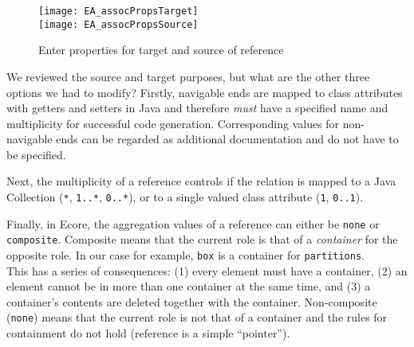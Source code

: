 \begin{itemize}
\vspace{0.5cm}

\begin{figure}[htbp]
	\centering
	  \texttt{[image: EA\_assocPropsTarget]}\\
  \vspace{1cm}
    \texttt{[image: EA\_assocPropsSource]}
	\caption{Enter properties for target and source of reference}
	\label{fig:reference_ends}
\end{figure}
\FloatBarrier

\end{itemize}

We reviewed the source and target purposes, but what are the other three options we had to modify? Firstly, navigable ends are mapped to class attributes with
getters and setters in Java and therefore \emph{must} have a specified name and  multiplicity for successful code generation. Corresponding values for
non-navigable ends can  be regarded as additional documentation and do not have to be specified.

Next, the multiplicity of a reference controls if the relation is mapped to a Java Collection (\texttt{*},  \texttt{1..*}, \texttt{0..*}), or to a single valued
class attribute (\texttt{1}, \texttt{0..1}).

Finally, in Ecore, the aggregation values of a reference can either be \texttt{none} or \texttt{com\-po\-site}. Composite means that the current role is that of
a \emph{container} for the opposite role.
In our case for example, \texttt{box} is a container for \texttt{partitions}.\\
This has a series of consequences: (1) every element must have a container, (2) an element cannot be in more than one container at the same time, and (3) a
container's contents are deleted together with the container. Non-composite (\texttt{none}) means that the current role is not that of a container and the rules
for containment do not hold (reference is a simple ``pointer'').

